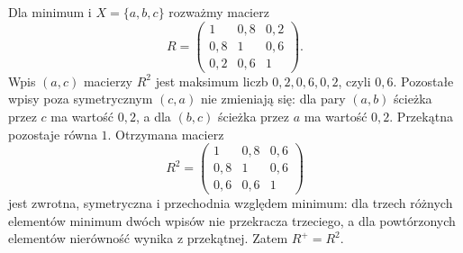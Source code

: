 \begin{przyklad}
\label{ex:lst-fuzzy-relation-matrix}
Dla minimum i $X=\{a,b,c\}$ rozważmy macierz
\[
 R=\begin{pmatrix}
 1&0{,}8&0{,}2\\
 0{,}8&1&0{,}6\\
 0{,}2&0{,}6&1
 \end{pmatrix}.
\]
Wpis $(a,c)$ macierzy $R^2$ jest maksimum liczb
$0{,}2,0{,}6,0{,}2$, czyli $0{,}6$.
Pozostałe wpisy poza symetrycznym $(c,a)$ nie zmieniają się:
dla pary $(a,b)$ ścieżka przez $c$ ma wartość $0{,}2$,
a dla $(b,c)$ ścieżka przez $a$ ma wartość $0{,}2$.
Przekątna pozostaje równa $1$. Otrzymana macierz
\[
 R^2=\begin{pmatrix}
 1&0{,}8&0{,}6\\
 0{,}8&1&0{,}6\\
 0{,}6&0{,}6&1
 \end{pmatrix}
\]
jest zwrotna, symetryczna i przechodnia względem minimum:
dla trzech różnych elementów minimum dwóch wpisów
nie przekracza trzeciego, a dla powtórzonych elementów
nierówność wynika z przekątnej. Zatem $R^+=R^2$.
\end{przyklad}

